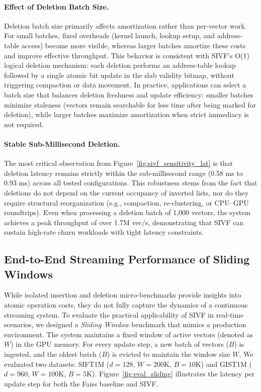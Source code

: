 \documentclass[sigconf,nonacm]{acmart}
\theoremstyle{plain}
\theoremstyle{definition}
\theoremstyle{remark}
\begin{document}
\paragraph{Effect of Deletion Batch Size.}
Deletion batch size primarily affects amortization rather than per-vector work. For small batches, fixed overheads (kernel launch, lookup setup, and address-table access) become more visible, whereas larger batches amortize these costs and improve effective throughput. This behavior is consistent with SIVF's O(1) logical deletion mechanism: each deletion performs an address-table lookup followed by a single atomic bit update in the slab validity bitmap, without triggering compaction or data movement. In practice, applications can select a batch size that balances deletion freshness and update efficiency: smaller batches minimize staleness (vectors remain searchable for less time after being marked for deletion), while larger batches maximize amortization when strict immediacy is not required.

\paragraph{Stable Sub-Millisecond Deletion.}
The most critical observation from Figure~\ref{fig:sivf_sensitivity_lat} is that deletion latency remains strictly within the sub-millisecond range (0.58 ms to 0.93 ms) across all tested configurations. This robustness stems from the fact that deletions do not depend on the current occupancy of inverted lists, nor do they require structural reorganization (e.g., compaction, re-clustering, or CPU--GPU roundtrips). Even when processing a deletion batch of 1{,}000 vectors, the system achieves a peak throughput of over 1.7M vec/s, demonstrating that SIVF can sustain high-rate churn workloads with tight latency constraints.

\subsection{End-to-End Streaming Performance of Sliding Windows}
\label{sec:eval_streaming}

While isolated insertion and deletion micro-benchmarks provide insights into atomic operation costs, they do not fully capture the dynamics of a continuous streaming system. To evaluate the practical applicability of SIVF in real-time scenarios, we designed a \textit{Sliding Window} benchmark that mimics a production environment. The system maintains a fixed window of active vectors (denoted as $W$) in the GPU memory. For every update step, a new batch of vectors ($B$) is ingested, and the oldest batch ($B$) is evicted to maintain the window size $W$.
We evaluated two datasets: SIFT1M ($d=128$, $W=200\text{K}$, $B=10\text{K}$) and GIST1M ($d=960$, $W=100\text{K}$, $B=5\text{K}$). Figure~\ref{fig:eval_sliding} illustrates the latency per update step for both the Faiss baseline and SIVF.
\end{document}

